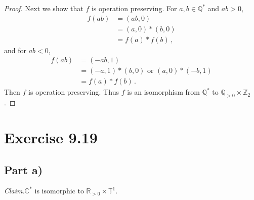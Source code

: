 \documentclass{abrice}
\newcommand{\Z}{\mathbb{Z}}
\newcommand{\R}{\mathbb{R}}
\newcommand{\Q}{\mathbb{Q}}
\renewcommand{\C}{\mathbb{C}}
\newcommand{\T}{\mathbb{T}}
\newcommand{\Claim}{\noindent\emph{Claim.}\xspace}%
\begin{document}
\begin{proof}
  Next we show that $f$ is operation preserving. For $a, b \in \Q^*$ and $ab >
  0$,
  \begin{align*}
    f(ab)
    &= (ab, 0) \\
    &= (a, 0) * (b, 0) \\
    &= f(a) * f(b)\, ,
  \end{align*}
  and for $ab < 0$,
  \begin{align*}
    f(ab)
    &= (-ab, 1) \\
    &= (-a, 1) * (b, 0) \text{ or } (a,0) * (-b, 1) \\
    &= f(a) * f(b)\, .
  \end{align*}
  Then $f$ is operation preserving. Thus $f$ is an isomorphism from $\Q^*$ to $\Q_{>0}
  \times \Z_2$.
\end{proof}

\section{Exercise 9.19}

\subsection{Part a)}

\Claim $\C^*$ is isomorphic to $\R_{>0} \times \T^1$.
\end{document}
